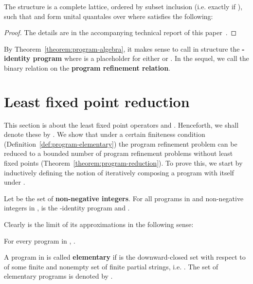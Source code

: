 \documentclass{llncs}
\newcommand{\defn}[1]{\textbf{#1}}
\begin{document}
\begin{theorem}
\label{theorem:program-algebra}
The structure  is a complete lattice, ordered by subset inclusion (i.e.  exactly if ), such that  and  form unital quantales over  where  satisfies the following:

\end{theorem}
\begin{proof}
The details are in the accompanying technical report of this paper~\cite{HA2014}.
\end{proof}

By Theorem~\ref{theorem:program-algebra}, it makes sense to call  in structure  the \defn{-identity program} where  is a placeholder for either  or . In the sequel, we call the binary relation  on  the \defn{program refinement relation}.

\section{Least fixed point reduction}
\vspace{-0.3em}
\label{label:least-fixed-point-reduction}

This section is about the least fixed point operators  and . Henceforth, we shall denote these by . We show that under a certain finiteness condition (Definition~\ref{def:program-elementary}) the program refinement problem  can be reduced to a bounded number of program refinement problems without least fixed points (Theorem~\ref{theorem:program-reduction}). To prove this, we start by inductively defining the notion of iteratively composing a program with itself under .

\begin{definition}
\label{def:program-n-iterated-composition}
Let  be the set of \defn{non-negative integers}. For all programs  in  and non-negative integers  in ,  is the -identity program and .
\end{definition}

Clearly  is the limit of its approximations in the following sense:

\begin{proposition}
\label{proposition:program-least-fixed-point-as-n-iterated-composition}
For every program  in , .
\end{proposition}


\begin{definition}
\label{def:program-elementary}
A program  in  is called \defn{elementary} if  is the downward-closed set with respect to  of some finite and nonempty set  of finite partial strings, i.e. . The set of elementary programs is denoted by .
\end{definition}
\end{document}
